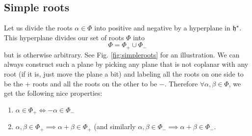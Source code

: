 \subsection*{Simple roots} Let us divide the roots $\alpha\in \Phi$ into positive and negative by a hyperplane in $\mathfrak{h}^*.$ This hyperplane divides our set of roots $\Phi$ into
$$\Phi=\Phi_+ \cup \Phi_-$$
but is otherwise arbitrary. See Fig. \ref{fig:simpleroots} for an illustration. We can always construct such a plane by picking any plane that is not coplanar with any root (if it is, just move the plane a bit) and labeling all the roots on one side to be the $+$ roots and all the roots on the other to be $-$. Therefore
$\forall \alpha,\beta \in \Phi$, we get the following nice properties:
\begin{enumerate}
    \item $\alpha\in \Phi_+\iff -\alpha \in \Phi_-$
    \item $\alpha,\beta \in \Phi_+ \implies \alpha+\beta \in \Phi_+$ (and similarly $\alpha,\beta\in \Phi_- \implies \alpha+\beta \in \Phi_-$.
\end{enumerate}

